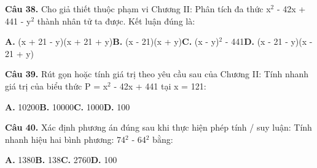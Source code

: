 \documentclass[11pt,a4paper]{article}
\begin{document}
\textbf{\color{primary} Câu 38.} Cho giả thiết thuộc phạm vi Chương II: Phân tích đa thức x$^2$ - 42x + 441 - y$^2$ thành nhân tử ta được. Kết luận đúng là:\par
\hspace*{1.5em}\textbf{A.} (x + 21 - y)(x + 21 + y)\quad\quad \textbf{B.} (x - 21)(x + y)\quad\quad \textbf{C.} (x - y)$^2$ - 441\quad\quad \textbf{D.} (x - 21 - y)(x - 21 + y)\par\vspace{2pt}
\textbf{\color{primary} Câu 39.} Rút gọn hoặc tính giá trị theo yêu cầu sau của Chương II: Tính nhanh giá trị của biểu thức P = x$^2$ - 42x + 441 tại x = 121:\par
\hspace*{1.5em}\textbf{A.} 10200\quad\quad \textbf{B.} 10000\quad\quad \textbf{C.} 1000\quad\quad \textbf{D.} 100\par\vspace{2pt}
\textbf{\color{primary} Câu 40.} Xác định phương án đúng sau khi thực hiện phép tính / suy luận: Tính nhanh hiệu hai bình phương: 74$^2$ - 64$^2$ bằng:\par
\hspace*{1.5em}\textbf{A.} 1380\quad\quad \textbf{B.} 138\quad\quad \textbf{C.} 2760\quad\quad \textbf{D.} 100\par\vspace{2pt}
\end{document}
